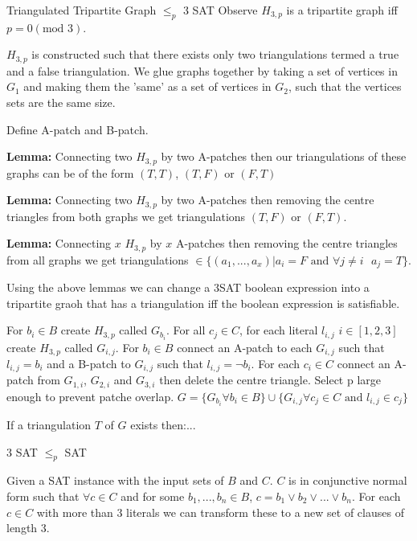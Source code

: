 \documentclass[final]{beamer}
\newlength{\colwidth}
\newcounter{col}
\begin{document}
\begin{frame}[t]
\begin{columns}[t]
\begin{column}{\colwidth}
\begin{block}{Triangulated Tripartite Graph $\leq_p$ 3 SAT}
Observe $H_{3,p}$ is a tripartite graph iff $p=0 (\text{mod }3)$.

$H_{3,p}$ is constructed such that there exists only two triangulations termed a true and a false triangulation. We glue graphs together by taking a set of vertices in $G_1$ and making them the 'same' as a set of vertices in $G_2$, such that the vertices sets are the same size.

Define A-patch and B-patch.

\textbf{Lemma:} Connecting two $H_{3,p}$ by two A-patches then our triangulations of these graphs can be of the form $(T,T)$, $(T,F)$ or $(F,T)$

\textbf{Lemma:} Connecting two $H_{3,p}$ by two A-patches then removing the centre triangles from both graphs we get triangulations $(T,F)$ or $(F,T)$.

\textbf{Lemma:} Connecting $x$ $H_{3,p}$ by $x$ A-patches then removing the centre triangles from all graphs we get triangulations $\in \{(a_1,...,a_x)| a_i=F\text{ and } \forall j\neq i\text{ } a_j=T \}$.

Using the above lemmas we can change a 3SAT boolean expression into a tripartite graoh that has a triangulation iff the boolean expression is satisfiable.

For $b_i\in B$ create $H_{3,p}$ called $G_{b_i}$. For all $c_j\in C$, for each literal $l_{i,j}$ $i\in [1,2,3]$  create $H_{3,p}$ called $G_{i,j}$. For $b_i \in B$ connect an A-patch to each $G_{i,j}$ such that $l_{i,j}=b_i$ and a B-patch to $G_{i,j}$ such that $l_{i,j}=\neg b_i$. For each $c_i\in C$ connect an A-patch from $G_{1,i}$, $G_{2,i}$ and $G_{3,i}$ then delete the centre triangle. Select p large enough to prevent patche overlap. $G = \{G_{b_i} \forall b_i \in B\}\cup\{G_{i,j} \forall c_j\in C\text{ and }l_{i,j}\in c_j \}$

If a triangulation $T$ of $G$ exists then:...











  \end{block}
  \begin{block}{3 SAT $\leq_p$  SAT}

Given a SAT instance with the input sets of $B$ and $C$. $C$ is in conjunctive normal form such that $\forall c \in C$ and for some $b_1, ... ,b_n \in B$, $c = b_1 \lor b_2 \lor ... \lor b_n$. For each $c \in C$ with more than 3 literals we can transform these to a new set of clauses of length 3. 


\end{block}
\end{column}
\end{columns}
\end{frame}
\end{document}
